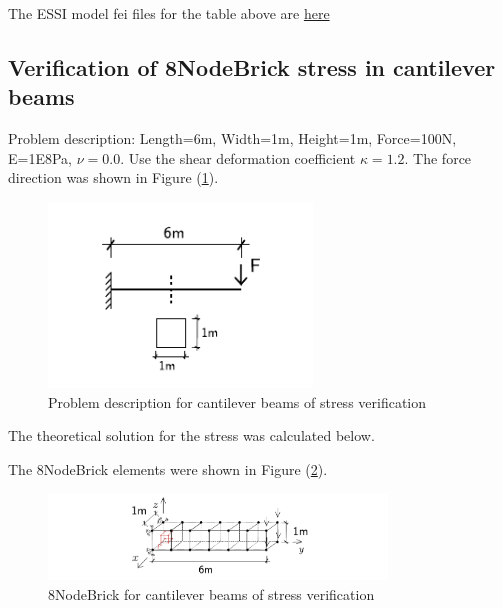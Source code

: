 \documentclass[fleqn,11pt]{article}
\begin{document}
The ESSI model fei files for the table above are \href{https://github.com/yuan-energy/ESSI_Verification/blob/master/8NodeBrick/clamped_beam_cut/clamped_beam_cut.tar.gz?raw=true}{here}








\newpage
\subsection{Verification of 8NodeBrick stress in cantilever beams}





Problem description: Length=6m, Width=1m, Height=1m, Force=100N, E=1E8Pa, $\nu=0.0$. Use the shear deformation coefficient $\kappa=1.2$. The force direction was shown in Figure (\ref{fig Problem description for cantilever beams of stress verification}). 

\begin{figure}[H]
  \centering
  \includegraphics[width=7cm]{../Figure-files/cantilever_6.pdf}
  \caption{Problem description for cantilever beams of stress verification}
  \label{fig Problem description for cantilever beams of stress verification}
\end{figure}

The theoretical solution for the stress was calculated below. 

The 8NodeBrick elements were shown in Figure (\ref{fig 8NodeBrick for cantilever beams of stress verification}).
\begin{figure}[H]
  \centering
  \includegraphics[width=9cm]{../Figure-files/beam_8brick_6div_gp.pdf}
  \caption{8NodeBrick for cantilever beams of stress verification}
  \label{fig 8NodeBrick for cantilever beams of stress verification}
\end{figure}
\end{document}
